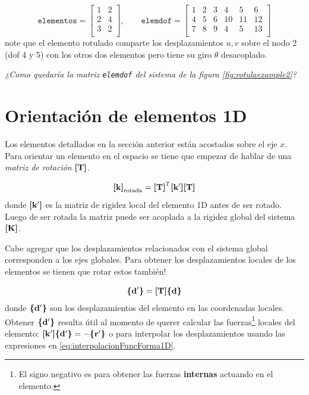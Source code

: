 \begin{equation*} \label{eq:elemdofParaRotulaEjemplo}
\texttt{elementos} = \begin{bmatrix}
1 & 2  \\
2 & 4 \\
3 & 2\\
\end{bmatrix},
\qquad
\texttt{elemdof} = \begin{bmatrix}
1 & 2 & 3 & 4 & 5 & 6 \\
4 & 5 & 6 & 10 & 11 & 12  \\
7 & 8 & 9 & 4 & 5 & 13 \\
\end{bmatrix}
\end{equation*}
note que el elemento rotulado comparte los desplazamientos $u,v$ sobre el nodo 2 (dof 4 y 5) con los otros dos elementos pero tiene su giro $\theta$ desacoplado.

\textit{¿Como quedaría la matriz \texttt{elemdof} del sistema de la figura \ref{fig:rotulaexample2}?}


\section{Orientación de elementos 1D} \label{sec:OrientacionElementos}
Los elementos detallados en la sección anterior están acostados sobre el eje $x$. Para orientar un elemento en el espacio se tiene que empezar de hablar de una \textit{matriz de rotación} $\boldsymbol{[}\mathbf{T} \boldsymbol{]}$.

\begin{equation} \label{eq:rotacionElemento}
	\boldsymbol{[}\mathbf{k} \boldsymbol{]}_{\mathrm{rotada}}= \boldsymbol{[}\mathbf{T} \boldsymbol{]}^T \boldsymbol{[}\mathbf{k'} \boldsymbol{]} \boldsymbol{[}\mathbf{T} \boldsymbol{]}
\end{equation}
donde $\boldsymbol{[}\mathbf{k'} \boldsymbol{]} $ es la matriz de rigidez local del elemento 1D antes de ser rotado. Luego de ser rotada la matriz puede ser acoplada a la rigidez global del sistema $\boldsymbol{[}\mathbf{K} \boldsymbol{]}$.

Cabe agregar que los desplazamientos relacionados con el sistema global corresponden a los ejes globales. Para obtener los desplazamientos locales de los elementos se tienen que rotar estos también!

\begin{equation} \label{eq:rotacionDesplazamientos}
\boldsymbol{\{ }\mathbf{d'} \boldsymbol{\}}= \boldsymbol{[}\mathbf{T} \boldsymbol{]} \boldsymbol{\{ }\mathbf{d} \boldsymbol{\}}  
\end{equation}
donde $\boldsymbol{\{ }\mathbf{d'} \boldsymbol{\}}$ son los desplazamientos del elemento en las coordenadas locales. Obtener $\boldsymbol{\{ }\mathbf{d'} \boldsymbol{\}}$ resulta útil al momento de querer calcular las fuerzas\footnote{El signo negativo es para obtener las fuerzas \textbf{internas} actuando en el elemento.} locales del elemento: \( \boldsymbol{[}\mathbf{k'} \boldsymbol{]}\boldsymbol{\{ }\mathbf{d'} \boldsymbol{\}}= - \boldsymbol{\{ }\mathbf{r'} \boldsymbol{\}} \) o para interpolar los desplazamientos usando las expresiones en \eqref{eq:interpolacionFuncForma1D}.

